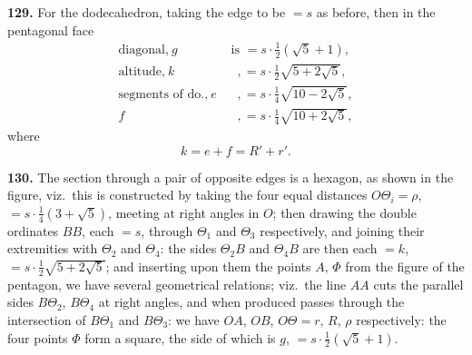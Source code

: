 \documentclass[11pt]{article}
\newcommand{\artno}[1]{\textbf{#1.}\quad}
\begin{document}
\bigskip
\noindent
\artno{129} For the dodecahedron, taking the edge to be $= s$ as before, then in
the pentagonal face
\begin{align*}
  \text{diagonal,}\ g &\text{ is } = s \cdot \tfrac{1}{2}(\sqrt{5} + 1),\\
  \text{altitude,}\ k &\text{ }\,, = s \cdot \tfrac{1}{2}\sqrt{5 + 2\sqrt{5}},\\
  \text{segments of do.,}\ e &\text{ }\,, = s \cdot \tfrac{1}{4}\sqrt{10 - 2\sqrt{5}},\\
  f &\text{ }\,, = s \cdot \tfrac{1}{4}\sqrt{10 + 2\sqrt{5}},
\end{align*}
where
\[
  k = e + f = R' + r'.
\]

\medskip
\noindent
\artno{130} The section through a pair of opposite edges is a hexagon, as
shown in the figure, viz.\ this is constructed by taking the four equal
distances $O\Theta_{i} = \rho$, $= s \cdot \tfrac{1}{4}(3 + \sqrt{5})$,
meeting at right angles in $O$; then drawing the double ordinates $BB$, each
$= s$, through $\Theta_{1}$ and $\Theta_{3}$ respectively, and joining their
extremities with $\Theta_{2}$ and $\Theta_{4}$: the sides $\Theta_{2}B$ and
$\Theta_{4}B$ are then each $= k$, $= s \cdot \tfrac{1}{2}\sqrt{5 + 2\sqrt{5}}$;
and inserting upon them the points $A$, $\Phi$ from the figure of the
pentagon, we have several geometrical relations; viz.\ the line $AA$ cuts the
parallel sides $B\Theta_{2}$, $B\Theta_{4}$ at right angles, and when produced
passes through the intersection of $B\Theta_{1}$ and $B\Theta_{3}$: we have
$OA$, $OB$, $O\Theta = r$, $R$, $\rho$ respectively: the four points $\Phi$
form a square, the side of which is $g$, $= s \cdot \tfrac{1}{2}(\sqrt{5} + 1)$.
\end{document}
